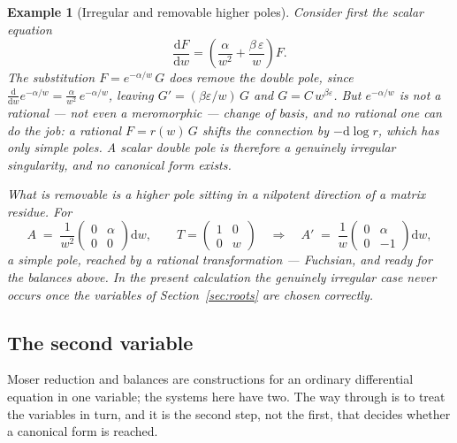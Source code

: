 \documentclass[11pt]{article}
\newcommand{\eps}{\varepsilon}
\newcommand{\dd}{\mathrm{d}}
\newtheorem{example}[definition]{Example}
\begin{document}
\begin{example}[Irregular and removable higher poles]
\label{ex:fuchs}
Consider first the scalar equation
\begin{equation}
  \frac{\dd F}{\dd w} = \left(\frac{\alpha}{w^2} +
  \frac{\beta\,\eps}{w}\right) F .
\end{equation}
The substitution $F = e^{-\alpha/w}\, G$ does remove the double
pole, since $\frac{\dd}{\dd w} e^{-\alpha/w} =
\frac{\alpha}{w^2}\,e^{-\alpha/w}$, leaving
$G' = (\beta\eps/w)\,G$ and $G = C\,w^{\beta\eps}$.  But
$e^{-\alpha/w}$ is not a rational --- not even a meromorphic ---
change of basis, and no rational one can do the job: a rational
$F = r(w)\,G$ shifts the connection by $-\dd\log r$, which has only
simple poles.  A scalar double pole is therefore a genuinely
irregular singularity, and no canonical form exists.

What \emph{is} removable is a higher pole sitting in a nilpotent
direction of a matrix residue.  For
\begin{equation}
  A \;=\; \frac{1}{w^2}
  \begin{pmatrix} 0 & \alpha \\ 0 & 0 \end{pmatrix} \dd w ,
  \qquad
  T = \begin{pmatrix} 1 & 0 \\ 0 & w \end{pmatrix}
  \quad\Longrightarrow\quad
  A' \;=\; \frac{1}{w}
  \begin{pmatrix} 0 & \alpha \\ 0 & -1 \end{pmatrix} \dd w ,
\end{equation}
a simple pole, reached by a rational transformation --- Fuchsian,
and ready for the balances above.  In the present calculation the
genuinely irregular case never occurs once the variables of
Section~\ref{sec:roots} are chosen correctly.
\end{example}

\subsection{The second variable}
\label{sec:secondvariable}

Moser reduction and balances are constructions for an ordinary
differential equation in one variable; the systems here have two.
The way through is to treat the variables in turn, and it is the
second step, not the first, that decides whether a canonical form is
reached.
\end{document}
